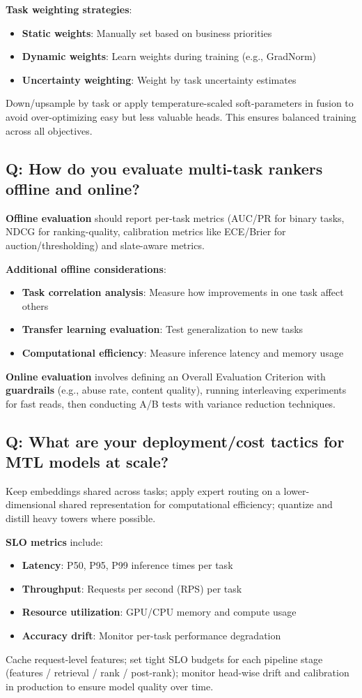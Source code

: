 \textbf{Task weighting strategies}:
\begin{itemize}
	\item \textbf{Static weights}: Manually set based on business priorities
	\item \textbf{Dynamic weights}: Learn weights during training (e.g., GradNorm)
	\item \textbf{Uncertainty weighting}: Weight by task uncertainty estimates
\end{itemize}

Down/upsample by task or apply temperature-scaled soft-parameters in fusion to avoid over-optimizing easy but less valuable heads. This ensures balanced training across all objectives.

\subsection*{Q: How do you evaluate multi-task rankers offline and online?}
\textbf{Offline evaluation} should report per-task metrics (AUC/PR for binary tasks, NDCG for ranking-quality, calibration metrics like ECE/Brier for auction/thresholding) and slate-aware metrics.

\textbf{Additional offline considerations}:
\begin{itemize}
	\item \textbf{Task correlation analysis}: Measure how improvements in one task affect others
	\item \textbf{Transfer learning evaluation}: Test generalization to new tasks
	\item \textbf{Computational efficiency}: Measure inference latency and memory usage
\end{itemize}

\textbf{Online evaluation} involves defining an Overall Evaluation Criterion with \textbf{guardrails} (e.g., abuse rate, content quality), running interleaving experiments for fast reads, then conducting A/B tests with variance reduction techniques.

\subsection*{Q: What are your deployment/cost tactics for MTL models at scale?}
Keep embeddings shared across tasks; apply expert routing on a lower-dimensional shared representation for computational efficiency; quantize and distill heavy towers where possible.

\textbf{SLO metrics} include:
\begin{itemize}
	\item \textbf{Latency}: P50, P95, P99 inference times per task
	\item \textbf{Throughput}: Requests per second (RPS) per task
	\item \textbf{Resource utilization}: GPU/CPU memory and compute usage
	\item \textbf{Accuracy drift}: Monitor per-task performance degradation
\end{itemize}

Cache request-level features; set tight SLO budgets for each pipeline stage (features / retrieval / rank / post-rank); monitor head-wise drift and calibration in production to ensure model quality over time.
